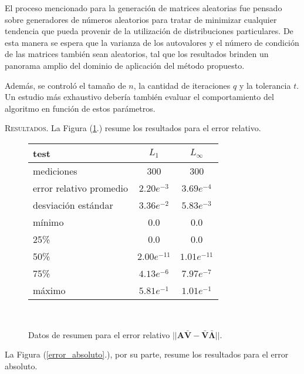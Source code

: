 El proceso mencionado para la generación de matrices aleatorias fue pensado sobre generadores de números aleatorios para tratar de minimizar cualquier tendencia que pueda provenir de la utilización de distribuciones particulares. De esta manera se espera que la varianza de los autovalores y el número de condición de las matrices también sean aleatorios, tal que los resultados brinden un panorama amplio del dominio de aplicación del método propuesto. 

Además, se controló el tamaño de $n$, la cantidad de iteraciones $q$ y la tolerancia $t$. Un estudio más exhaustivo debería también evaluar el comportamiento del algoritmo en función de estos parámetros.

\vspace{2em}
\noindent \textsc{Resultados}. La Figura (\ref{error_relativo}.) resume los resultados para el error relativo.

\vspace{1em}
\begin{figure}[!htbp]
    \begin{tabular}{ |l|c|c| } 
    \hline
    test                    & $L_1$             & $L_\infty$ \\
    \hline
    mediciones              & 300               & 300 \\
    error relativo promedio & $2.20e^{-3}$  & $3.69e^{-4}$ \\
    desviación estándar     & $3.36e^{-2}$  & $5.83e^{-3}$ \\
    mínimo                  & 0.0               & 0.0 \\
    25\%                    & 0.0               & 0.0 \\
    50\%                    & $2.00e^{-11}$ & $1.01e^{-11}$ \\
    75\%                    & $4.13e^{-6}$  & $7.97e^{-7}$ \\
    máximo                  & $5.81e^{-1}$  & $1.01e^{-1}$ \\
    \hline
    \end{tabular} \\
    \bigskip
    \caption{Datos de resumen para el error relativo $||\mathbf{A} \mathbf{\bar{V}} - \mathbf{\bar{V}} \mathbf{\bar{\Lambda}}||$.} \label{error_relativo}
\end{figure}

\vspace{1em}
\noindent La Figura (\ref{error_absoluto}.), por su parte, resume los resultados para el error absoluto.

